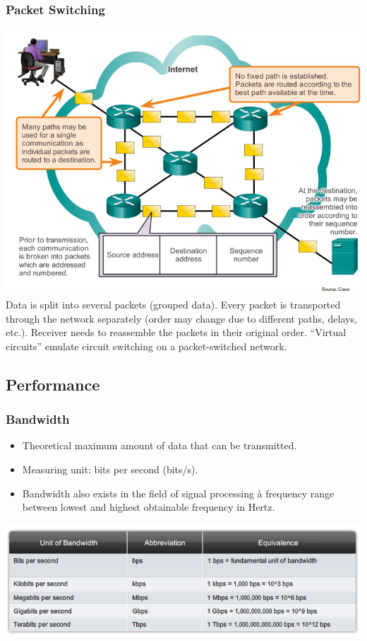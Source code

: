 \documentclass[11pt]{article}
\begin{document}
    \subsubsection{Packet Switching}
    \includegraphics[width=\textwidth]{packet-switching}
    Data is split into several packets (grouped data).
    Every packet is transported through the network separately (order may change due to different paths, delays, etc.).
    Receiver needs to reassemble the packets in their original order.
    “Virtual circuits” emulate circuit switching on a packet-switched network.
\subsection{Performance}
\subsubsection{Bandwidth}
    \begin{itemize}
        \item Theoretical maximum amount of data that can be transmitted.
        \item Measuring unit: bits per second (bits/s).
        \item Bandwidth also exists in the field of signal processing à frequency range between lowest and highest obtainable frequency in Hertz.
    \end{itemize}
    \includegraphics[width=\textwidth]{bandwidth}
\end{document}
